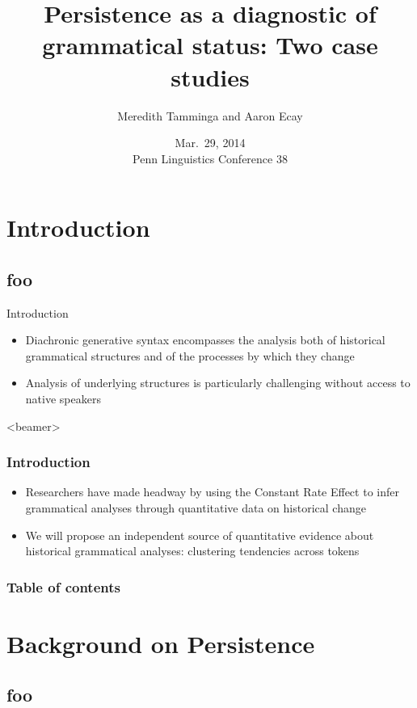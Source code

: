 \documentclass{digs-slides}
\title{Persistence as a diagnostic of grammatical status: Two case studies}
\author{Meredith Tamminga and Aaron Ecay}
\institute{University of Pennsylvania}
\date{Mar.\ 29, 2014 \\\vspace{0.5em} Penn Linguistics Conference 38}
\begin{document}
\begin{frame}
    \titlepage
\end{frame}

\section{Introduction}

\subsection*{foo}

\begin{frame}{Introduction}
    \begin{itemize}
      \item Diachronic generative syntax encompasses the analysis both
        of historical grammatical structures and of the processes by
        which they change
      \item Analysis of underlying structures is particularly challenging
        without access to native speakers
    \end{itemize}
\end{frame}

\begin{frame}<beamer>
    \frametitle{Introduction}
    \begin{itemize}
      \item Researchers have made headway by using the Constant Rate
        Effect \parencite{Kroch1989} to infer grammatical
        analyses through quantitative data on historical change
      \item We will propose an independent source of quantitative
        evidence about historical grammatical analyses: clustering
        tendencies across tokens
    \end{itemize}
\end{frame}

\begin{frame}
    \frametitle{Table of contents}
    \tableofcontents{}
\end{frame}

\section{Background on Persistence}

\subsection*{foo}
\end{document}

